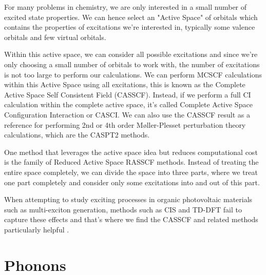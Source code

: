 For many problems in chemistry, we are only interested in a small number of excited state properties. We can hence select an "Active Space" of orbitals which contains the properties of excitations we're interested in, typically some valence orbitals and few virtual orbitals. 


Within this active space, we can consider all possible excitations and since we're only choosing a small number of orbitals to work with, the number of excitations is not too large to perform our calculations. We can perform MCSCF calculations within this Active Space using all excitations, this is known as the Complete Active Space Self Consistent Field (CASSCF). Instead, if we perform a full CI calculation within the complete active space, it's called Complete Active Space Configuration Interaction or CASCI. We can also use the CASSCF result as a reference for performing 2nd or 4th order  M{\o}ller-Plesset perturbation theory calculations, which are the CASPT2 methods. 

One method that leverages the active space idea but reduces computational cost is the family of Reduced Active Space RASSCF methods. Instead of treating the entire space completely, we can divide the space into three parts, where we treat one part completely and consider only some excitations into and out of this part.



When attempting to study exciting processes in organic photovoltaic materials such as multi-exciton generation, methods such as CIS and TD-DFT fail to capture these effects and that's where we find the CASSCF and related methods particularly helpful \cite{zimmerman2013correlated}.




\section{Phonons}







